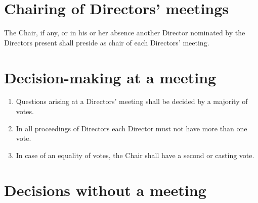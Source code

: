 \documentclass[a4paper,12pt]{article}
\begin{document}
\section{Chairing of Directors' meetings}

The Chair, if any, or in his or her absence another Director nominated by the Directors present shall preside as chair of each Directors' meeting.

\section{Decision-making at a meeting}

\begin{enumerate}
  \color{red}
  \item Questions arising at a Directors' meeting shall be decided by a majority of votes. %
  \item In all proceedings of Directors each Director must not have more than one vote.\color{black} %
  \item In case of an equality of votes, the Chair shall have a second or casting vote.
\end{enumerate}

\section{Decisions without a meeting}
\end{document}
